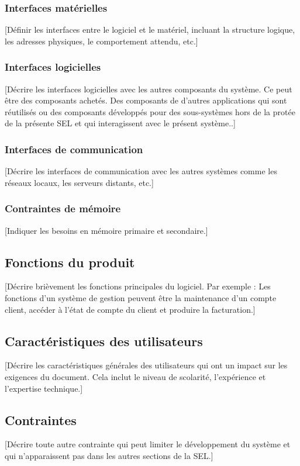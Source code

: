 \documentclass[10pt,a4paper]{report}
\begin{document}
\subsubsection{Interfaces matérielles}
[Définir les interfaces entre le logiciel et le matériel, incluant la structure logique, les adresses physiques, le comportement attendu, etc.]

\subsubsection{Interfaces logicielles}
[Décrire les interfaces logicielles avec les autres composants du système. Ce peut être des composants achetés. Des composants de d’autres applications qui sont réutilisés ou des composants développés pour des sous-systèmes hors de la protée de la présente SEL et qui interagissent avec le présent système..]

\subsubsection{Interfaces de communication}
[Décrire les interfaces de communication avec les autres systèmes comme les réseaux locaux, les serveurs distants, etc.]

\subsubsection{Contraintes de mémoire}
[Indiquer les besoins en mémoire primaire et secondaire.]

\subsection{Fonctions du produit}
[Décrire brièvement les fonctions principales du logiciel. Par exemple :
Les fonctions d’un système de gestion peuvent être la maintenance d’un compte client, accéder à l’état de compte du client et produire la facturation.]

\subsection{Caractéristiques des utilisateurs}
[Décrire les caractéristiques générales des utilisateurs qui ont un impact sur les exigences du document. Cela inclut le niveau de scolarité, l’expérience et l’expertise technique.]

\subsection{Contraintes}
[Décrire toute autre contrainte qui peut limiter le développement du système et qui n’apparaissent pas dans les autres sections de la SEL.]
\end{document}

